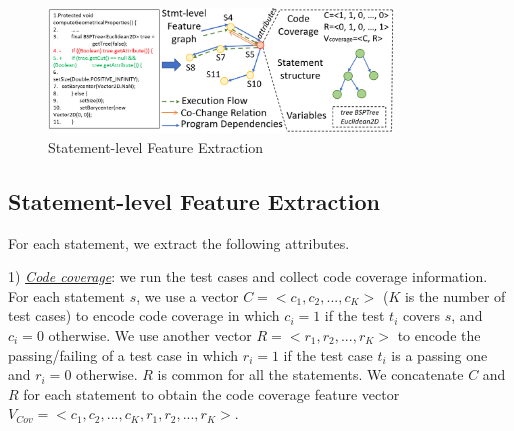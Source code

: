 

\begin{figure}[t]
	\centering
	\includegraphics[width=3.6in]{graphs/step-1-statement.png}
        \vspace{-19pt}
	\caption{Statement-level Feature Extraction}
        \vspace{-5pt}
	\label{statement-level-feature-extraction}
\end{figure}

\subsection{Statement-level Feature Extraction}

For each statement, we extract the following attributes.

1) {\em \underline{Code coverage}}: we run the test cases and collect
code coverage information. For each statement $s$, we use a vector $C
= <c_1, c_2, ..., c_K>$ ($K$ is the number of test cases) to encode
code coverage in which $c_i=1$ if the test $t_i$ covers $s$, and
$c_i=0$ otherwise. We use another vector $R = <r_1, r_2, ..., r_K>$ to
encode the passing/failing of a test case in which $r_i=1$ if the test
case $t_i$ is a passing one and $r_i=0$ otherwise. $R$ is common for
all the statements. We concatenate $C$ and $R$ for each statement to
obtain the code coverage feature vector $V_{Cov} = <c_1, c_2, ...,
c_K, r_1, r_2, ..., r_K>$.

